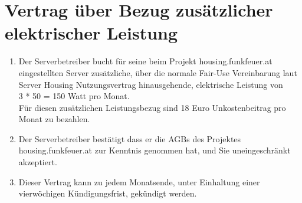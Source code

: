 \documentclass[parskip=half]{scrreprt}
\begin{document}
\chapter*{Vertrag über Bezug zusätzlicher elektrischer Leistung}


\begin{contract}
\begin{enumerate}
\item Der Serverbetreiber bucht für seine beim Projekt housing.funkfeuer.at eingestellten Server zusätzliche, über die normale Fair-Use Vereinbarung laut Server Housing Nutzungsvertrag hinausgehende, elektrische Leistung von
\vspace{0.2cm}\\
\hspace*{3mm}3 * 50 = 150 Watt pro Monat.
\vspace{0.2cm}\\
Für diesen zusätzlichen Leistungsbezug sind 18 Euro Unkostenbeitrag pro Monat zu bezahlen.
\item Der Serverbetreiber bestätigt dass er die AGBs des Projektes housing.funkfeuer.at zur Kenntnis genommen hat, und Sie uneingeschränkt akzeptiert.
\item Dieser Vertrag kann zu jedem Monatsende, unter Einhaltung einer vierwöchigen Kündigungsfrist, gekündigt werden.
\end{enumerate}
\end{contract}


\end{document}
